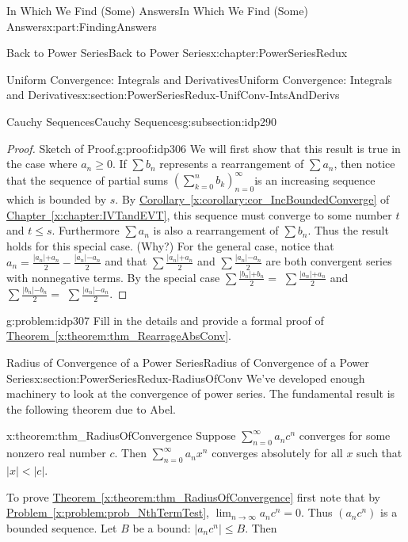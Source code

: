 \documentclass[oneside,10pt,]{book}
\newcommand{\xreffont}{\relax}
\numberwithin{equation}{section}
\newcommand{\abs}[1]{\left|#1\right|}
\def\limit#1#2#3{{\displaystyle\lim_{#1\rightarrow #2}#3}}
\newcommand{\lt}{<}
\begin{document}
\begin{partptx}{In Which We Find (Some) Answers}{}{In Which We Find (Some) Answers}{}{}{x:part:FindingAnswers}
\begin{chapterptx}{Back to Power Series}{}{Back to Power Series}{}{}{x:chapter:PowerSeriesRedux}
\begin{sectionptx}{Uniform Convergence: Integrals and Derivatives}{}{Uniform Convergence: Integrals and Derivatives}{}{}{x:section:PowerSeriesRedux-UnifConv-IntsAndDerivs}
\begin{subsectionptx}{Cauchy Sequences}{}{Cauchy Sequences}{}{}{g:subsection:idp290}
\begin{proof}{Sketch of Proof.}{g:proof:idp306}
We will first show that this result is true in the case where \(a_n\geq 0\). If \(\sum b_n\) represents a rearrangement of \(\sum a_n\), then notice that the sequence of partial sums \(\left(\sum_{k=0}^nb_k\right)_{n=0}^\infty\)is an increasing sequence which is bounded by \(s\). By \hyperref[x:corollary:cor_IncBoundedConverge]{Corollary~{\xreffont\ref{x:corollary:cor_IncBoundedConverge}}} of \hyperref[x:chapter:IVTandEVT]{Chapter~{\xreffont\ref{x:chapter:IVTandEVT}}}, this sequence must converge to some number \(t\) and \(t\leq s\). Furthermore \(\sum a_n\) is also a rearrangement of \(\sum b_n\). Thus the result holds for this special case. (Why?) For the general case, notice that \(a_n=\frac{|a_n\mathopen|+a_n}{2}-\frac{|a_n\mathopen|-a_n}{2}\) and that \(\sum\frac{|a_n\mathopen|+a_n}{2}\) and \(\sum\frac{|a_n\mathopen|-a_n}{2}\) are both convergent series with nonnegative terms. By the special case \(\sum\frac{|b_n\mathopen|+b_n}{2}=\) \(\sum\frac{|a_n\mathopen|+a_n}{2}\) and \(\sum\frac{|b_n\mathopen|-b_n}{2}=\) \(\sum\frac{|a_n\mathopen|-a_n}{2}\).%
\end{proof}
\begin{problem}{}{g:problem:idp307}%
 Fill in the details and provide a formal proof of \hyperref[x:theorem:thm_RearrageAbsConv]{Theorem~{\xreffont\ref{x:theorem:thm_RearrageAbsConv}}}.%
\end{problem}
\end{subsectionptx}
\end{sectionptx}
%
%
\typeout{************************************************}
\typeout{************************************************}
%
\begin{sectionptx}{Radius of Convergence of a Power Series}{}{Radius of Convergence of a Power Series}{}{}{x:section:PowerSeriesRedux-RadiusOfConv}
We've developed enough machinery to look at the convergence of power series. The fundamental result is the following theorem due to Abel.%
\begin{theorem}{}{}{x:theorem:thm_RadiusOfConvergence}%
 Suppose \(\sum_{n=0}^\infty a_nc^n\) converges for some nonzero real number \(c\). Then \(\sum_{n=0}^\infty a_nx^n\) converges absolutely for all \(x\) such that \(|x|\lt |c|\).%
\end{theorem}
To prove \hyperref[x:theorem:thm_RadiusOfConvergence]{Theorem~{\xreffont\ref{x:theorem:thm_RadiusOfConvergence}}} first note that by \hyperref[x:problem:prob_NthTermTest]{Problem~{\xreffont\ref{x:problem:prob_NthTermTest}}}, \(\limit{n}{\infty}{a_nc^n}=0\). Thus \(\left(a_nc^n\right)\) is a bounded sequence. Let \(B\) be a bound: \(\abs{a_nc^n}\le B\). Then%

\end{sectionptx}
\end{chapterptx}
\end{partptx}
\end{document}
